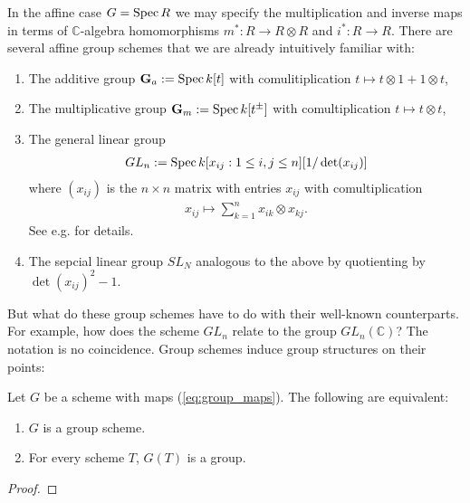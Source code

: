 \documentclass[12pt]{ociamthesis}  %
\begin{document}
\begin{example}\label{ex:group_schemes}
  In the affine case $G = \operatorname{Spec} R$ we may specify the multiplication
  and inverse maps in terms of $\mathbb{C}$-algebra homomorphisms
  $m^* : R \to R\otimes R$ and $i^* : R\to R$.
  There are several affine group schemes that we are already
  intuitively familiar with:
  \begin{enumerate}
    \item The additive group $\mathbf{G}_a := \operatorname{Spec} k[t]$ with
      comulitiplication $t\mapsto t\otimes 1 + 1\otimes t$,
    \item The multiplicative group $\mathbf{G}_m := \operatorname{Spec} k[t^\pm]$
      with comultiplication $t\mapsto t\otimes t$,
    \item The general linear group
      \begin{align*}
        GL_n := \operatorname{Spec} k[x_{ij} : 1\leq i,j\leq n][1/\det(x_{ij})]
      \end{align*}
      where $(x_{ij})$ is the $n\times n$ matrix with entries $x_{ij}$
      with comultiplication
      \begin{align*}
        x_{ij} \mapsto \sum_{k=1}^n x_{ik}\otimes x_{kj}.
      \end{align*}
      See e.g. \cite[\href{https://stacks.math.columbia.edu/tag/022W}{Tag 022W}]{stacks-project} for details.
    \item The sepcial linear group $SL_N$ analogous to the above by
      quotienting by $\det(x_{ij})^2 - 1$.
  \end{enumerate}
\end{example}
But what do these group schemes have to do with their well-known
counterparts. For example, how does the scheme $GL_n$ relate to the
group $GL_n(\mathbb{C})$? The notation is no coincidence.
Group schemes induce group structures on their points:
\begin{lemma}
  Let $G$ be a scheme with maps (\ref{eq:group_maps}). The following
  are equivalent:
  \begin{enumerate}
    \item $G$ is a group scheme.
    \item For every scheme $T$, $G(T)$ is a group.
  \end{enumerate}
  \begin{proof}

    \missingproof
  \end{proof}
\end{lemma}
\end{document}
